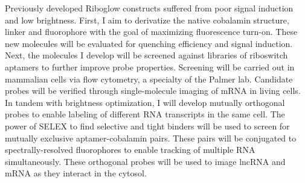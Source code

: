 \documentclass{F32}
\begin{document}
Previously developed Riboglow constructs suffered from poor signal induction and low brightness. First, I aim to derivatize the native cobalamin structure, linker and fluorophore with the goal of maximizing fluorescence turn-on. These new molecules will be evaluated for quenching efficiency and signal induction. Next, the molecules I develop will be screened against libraries of riboswitch aptamers to further improve probe properties. Screening will be carried out in mammalian cells via flow cytometry, a specialty of the Palmer lab. Candidate probes will be verified through single-molecule imaging of mRNA in living cells. In tandem with brightness optimization, I will develop mutually orthogonal probes to enable labeling of different RNA transcripts in the same cell. The power of SELEX to find selective and tight binders will be used to screen for mutually exclusive aptamer-cobalamin pairs. These pairs will be conjugated to spectrally-resolved fluorophores to enable tracking of multiple RNA simultaneously. These orthogonal probes will be used to image lncRNA and mRNA as they interact in the cytosol.
\end{document}
